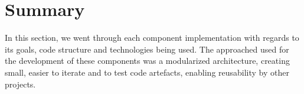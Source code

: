 \section{Summary}

In this section, we went through each component implementation with regards to its goals, code structure and technologies being used. The approached used for the development of these components was a modularized architecture, creating small, easier to iterate and to test code artefacts, enabling reusability by other projects.
